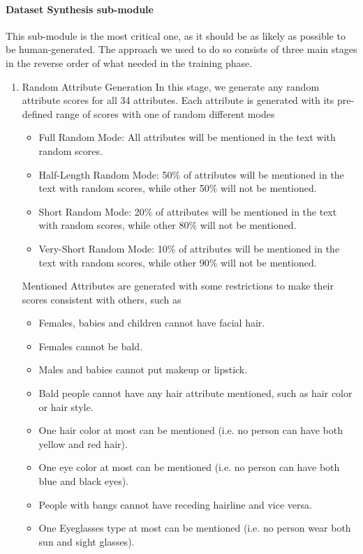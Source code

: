 \paragraph{Dataset Synthesis sub-module}
This sub-module is the most critical one, as it should be as likely as possible to be human-generated. The approach we used to do so consists of three main stages in the reverse order of what needed in the training phase.

\begin{enumerate}
    \item Random Attribute Generation
        In this stage, we generate any random attribute scores for all 34 attributes. Each attribute is generated with its pre-defined range of scores with one of random different modes
        
        \begin{itemize}
            \item Full Random Mode: All attributes will be mentioned in the text with random scores.
            
            \item Half-Length Random Mode: 50\% of attributes will be mentioned in the text with random scores, while other 50\% will not be mentioned.
            
            \item Short Random Mode: 20\% of attributes will be mentioned in the text with random scores, while other 80\% will not be mentioned.
            
            \item Very-Short Random Mode: 10\% of attributes will be mentioned in the text with random scores, while other 90\% will not be mentioned.
        \end{itemize}
        
        Mentioned Attributes are generated with some restrictions to make their scores consistent with others, such as
        \begin{itemize}
            \item Females, babies and children cannot have facial hair.
            \item Females cannot be bald.
            \item Males and babies cannot put makeup or lipstick.
            \item Bald people cannot have any hair attribute mentioned, such as hair color or hair style.
            \item One hair color at most can be mentioned (i.e. no person can have both yellow and red hair).
            \item One eye color at most can be mentioned (i.e. no person can have both blue and black eyes).
            \item People with bangs cannot have receding hairline and vice versa.
            \item One Eyeglasses type at most can be mentioned (i.e. no person wear both sun and sight glasses).
        \end{itemize}
    

\end{enumerate}
